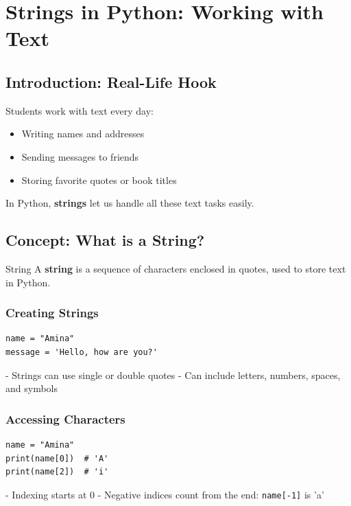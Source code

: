\chapter{Strings in Python: Working with Text}

\section{Introduction: Real-Life Hook}

Students work with text every day:  

\begin{itemize}
    \item Writing names and addresses  
    \item Sending messages to friends  
    \item Storing favorite quotes or book titles  
\end{itemize}

In Python, \textbf{strings} let us handle all these text tasks easily.

\section{Concept: What is a String?}

\begin{definition}{String}
A \textbf{string} is a sequence of characters enclosed in quotes, used to store text in Python.
\end{definition}

\subsection{Creating Strings}

\begin{verbatim}
name = "Amina"
message = 'Hello, how are you?'
\end{verbatim}

- Strings can use single or double quotes  
- Can include letters, numbers, spaces, and symbols  

\subsection{Accessing Characters}

\begin{verbatim}
name = "Amina"
print(name[0])  # 'A'
print(name[2])  # 'i'
\end{verbatim}

- Indexing starts at 0  
- Negative indices count from the end: \texttt{name[-1]} is 'a'


